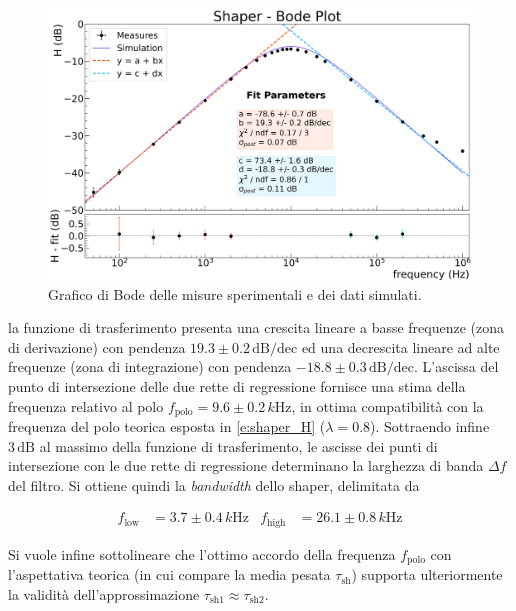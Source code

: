\documentclass[a4paper,11pt]{article} %
\begin{document}
\begin{figure}[H] 
	\centering 
	\includegraphics[width=0.8\linewidth]{../Plots/Shaper/bode_plot.png} 
	\vspace{-10pt}
	\caption{\small Grafico di Bode delle misure sperimentali e dei dati simulati.} 
	\label{i:shaper_thebode} 
\end{figure} 
\vspace{-7pt}
la funzione di trasferimento presenta una crescita lineare a basse frequenze (zona di derivazione) con pendenza $19.3
\pm 0.2 \,\text{dB/dec}$ ed una decrescita lineare ad alte frequenze (zona di integrazione) con pendenza $-18.8 \pm 0.3
\,\text{dB/dec}$. L'ascissa del punto di intersezione delle due rette di regressione fornisce una stima della frequenza
relativo al polo $f_{\text{polo}} = 9.6 \pm 0.2 \,\si{k\Hz}$, in ottima compatibilità con la frequenza del polo teorica
esposta in \autoref{e:shaper_H} ($\lambda = 0.8$). Sottraendo infine $3\,\text{dB}$ al massimo della funzione di
trasferimento, le ascisse dei punti di intersezione con le due rette di regressione determinano la larghezza di banda
$\Delta f$ del filtro. Si ottiene quindi la \textit{bandwidth} dello shaper, delimitata da 

\begin{align}\label{e:shaper_bw} 
	f_{\text{low}} &= 3.7 \pm 0.4 \,\si{k\Hz} 
	& 
	f_{\text{high}} &= 26.1 \pm 0.8\,\si{k\Hz} 
\end{align}

Si vuole infine sottolineare che l'ottimo accordo della frequenza $f_{\text{polo}}$ con l'aspettativa teorica (in cui
compare la media pesata $\tau_{\text{sh}}$) supporta ulteriormente la validità dell'approssimazione $\tau_{\text{sh}1}
\approx \tau_{\text{sh}2}$.

\end{document}
